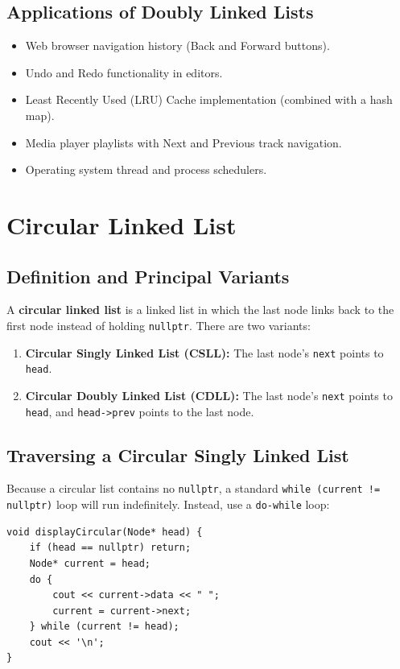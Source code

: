 \subsection{Applications of Doubly Linked Lists}
\begin{itemize}
    \item Web browser navigation history (Back and Forward buttons).
    \item Undo and Redo functionality in editors.
    \item Least Recently Used (LRU) Cache implementation (combined with a hash map).
    \item Media player playlists with Next and Previous track navigation.
    \item Operating system thread and process schedulers.
\end{itemize}

\section{Circular Linked List}

\subsection{Definition and Principal Variants}

A \textbf{circular linked list} is a linked list in which the last node links back to the first node instead of holding \texttt{nullptr}. There are two variants:
\begin{enumerate}
    \item \textbf{Circular Singly Linked List (CSLL):} The last node's \texttt{next} points to \texttt{head}.
    \item \textbf{Circular Doubly Linked List (CDLL):} The last node's \texttt{next} points to \texttt{head}, and \texttt{head->prev} points to the last node.
\end{enumerate}

\subsection{Traversing a Circular Singly Linked List}

Because a circular list contains no \texttt{nullptr}, a standard \texttt{while (current != nullptr)} loop will run indefinitely. Instead, use a \texttt{do-while} loop:

\begin{lstlisting}[style=cppstyle]
void displayCircular(Node* head) {
    if (head == nullptr) return;
    Node* current = head;
    do {
        cout << current->data << " ";
        current = current->next;
    } while (current != head);
    cout << '\n';
}
\end{lstlisting}

